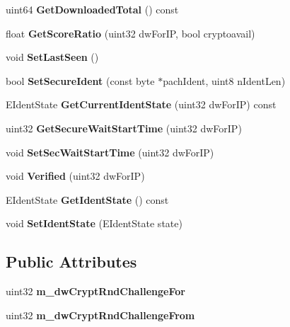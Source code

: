 \begin{DoxyCompactItemize}
\item 
uint64 {\bfseries GetDownloadedTotal} () const \label{classCClientCredits_aec64a94ea79304910f71c54fafaa221d}

\item 
float {\bfseries GetScoreRatio} (uint32 dwForIP, bool cryptoavail)\label{classCClientCredits_ac7c2c8520c6c3e72aa38d93bf1eed702}

\item 
void {\bfseries SetLastSeen} ()\label{classCClientCredits_a7bf9eb670ee0fa4984d83e2f04b85501}

\item 
bool {\bfseries SetSecureIdent} (const byte $\ast$pachIdent, uint8 nIdentLen)\label{classCClientCredits_a39872fb426adb3a1ab6edb22eb4b0276}

\item 
EIdentState {\bfseries GetCurrentIdentState} (uint32 dwForIP) const \label{classCClientCredits_ac3c2a6fd713cf7c82a0c89c2fadcc67b}

\item 
uint32 {\bfseries GetSecureWaitStartTime} (uint32 dwForIP)\label{classCClientCredits_a629a1d366771f7d15a904a542ae8df77}

\item 
void {\bfseries SetSecWaitStartTime} (uint32 dwForIP)\label{classCClientCredits_a2c46793a174fc8b3bc3db48167d560e5}

\item 
void {\bfseries Verified} (uint32 dwForIP)\label{classCClientCredits_a219bae03842ecf9bcb29531689069143}

\item 
EIdentState {\bfseries GetIdentState} () const \label{classCClientCredits_a7e7d25ee12c97f2d26d7443ce8606ce7}

\item 
void {\bfseries SetIdentState} (EIdentState state)\label{classCClientCredits_a7a4b58df202bdb5370fc9399d3efc77f}

\end{DoxyCompactItemize}
\subsection*{Public Attributes}
\begin{DoxyCompactItemize}
\item 
uint32 {\bfseries m\_\-dwCryptRndChallengeFor}\label{classCClientCredits_a24f86897dc5a50ba441af0b84f37b4d0}

\item 
uint32 {\bfseries m\_\-dwCryptRndChallengeFrom}\label{classCClientCredits_a0188e0fa7ae3d231e2d2b438a1738759}

\end{DoxyCompactItemize}
